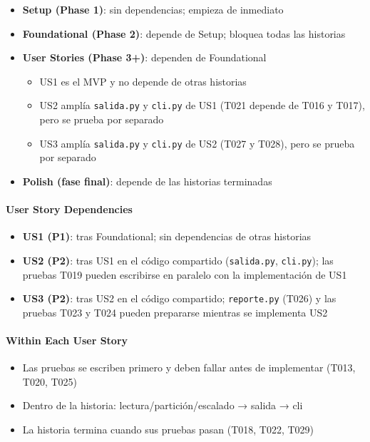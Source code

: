 \documentclass[12pt,a4paper]{article}
\providecommand{\tightlist}{\setlength{\itemsep}{0pt}\setlength{\parskip}{0pt}}
\newenvironment{documentogenerado}[2]{%
  \def\doccomando{#1}\def\docruta{#2}%
  \par\begingroup\small\setstretch{1.15}\sloppy%
}{\endgroup\par\medskip}
\begin{document}
\begin{documentogenerado}{/speckit-tasks (fase 7: /speckit-converge)}{specs\slash 001-preparacion-datos\slash tasks.md}
\begin{itemize}
\tightlist
\item
  \textbf{Setup (Phase 1)}: sin dependencias; empieza de inmediato
\item
  \textbf{Foundational (Phase 2)}: depende de Setup; bloquea todas las historias
\item
  \textbf{User Stories (Phase 3+)}: dependen de Foundational

  \begin{itemize}
  \tightlist
  \item
    US1 es el MVP y no depende de otras historias
  \item
    US2 amplía \texttt{salida.\allowbreak{}py} y \texttt{cli.\allowbreak{}py} de US1 (T021 depende de T016 y T017), pero se prueba por separado
  \item
    US3 amplía \texttt{salida.\allowbreak{}py} y \texttt{cli.\allowbreak{}py} de US2 (T027 y T028), pero se prueba por separado
  \end{itemize}
\item
  \textbf{Polish (fase final)}: depende de las historias terminadas
\end{itemize}

\paragraph{User Story Dependencies}

\begin{itemize}
\tightlist
\item
  \textbf{US1 (P1)}: tras Foundational; sin dependencias de otras historias
\item
  \textbf{US2 (P2)}: tras US1 en el código compartido (\texttt{salida.\allowbreak{}py}, \texttt{cli.\allowbreak{}py}); las pruebas T019 pueden escribirse en paralelo con la implementación de US1
\item
  \textbf{US3 (P2)}: tras US2 en el código compartido; \texttt{reporte.\allowbreak{}py} (T026) y las pruebas T023 y T024 pueden prepararse mientras se implementa US2
\end{itemize}

\paragraph{Within Each User Story}

\begin{itemize}
\tightlist
\item
  Las pruebas se escriben primero y deben fallar antes de implementar (T013, T020, T025)
\item
  Dentro de la historia: lectura/\hspace{0pt}partición/\hspace{0pt}escalado → salida → cli
\item
  La historia termina cuando sus pruebas pasan (T018, T022, T029)
\end{itemize}


\end{documentogenerado}
\end{document}
